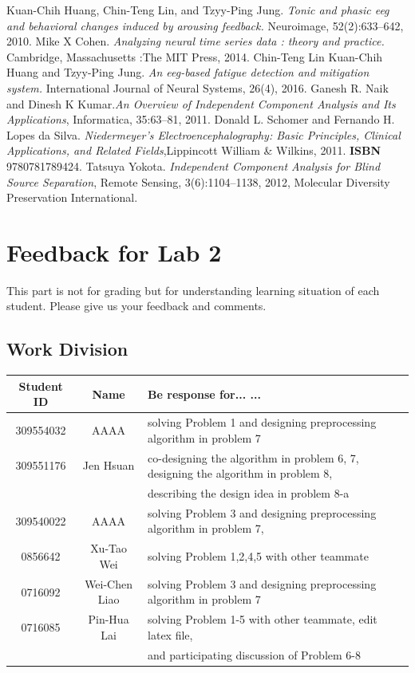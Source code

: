 \documentclass[a4 paper]{article}
\begin{document}
\begin{thebibliography}{6}
Kuan-Chih Huang, Chin-Teng Lin, and Tzyy-Ping Jung. \textit{Tonic and phasic eeg and behavioral changes induced by arousing feedback.} Neuroimage, 52(2):633–642, 2010.
Mike X Cohen. \textit{Analyzing neural time series data : theory and practice.} Cambridge, Massachusetts :The MIT Press, 2014.
\bibitem{}
Chin-Teng Lin Kuan-Chih Huang and Tzyy-Ping Jung. \textit{An eeg-based fatigue detection and mitigation system.} International Journal of Neural Systems, 26(4), 2016.
Ganesh R. Naik and Dinesh K Kumar.\textit{An Overview of Independent Component Analysis and Its Applications}, Informatica, 35:63--81, 2011.
Donald L. Schomer and Fernando H. Lopes da Silva.
\textit{Niedermeyer's Electroencephalography: Basic Principles, Clinical Applications, and Related Fields},Lippincott William \& Wilkins, 2011. \textbf{ISBN} 9780781789424.
Tatsuya Yokota. \textit{Independent Component Analysis for Blind Source Separation}, Remote Sensing, 3(6):1104--1138, 2012, Molecular Diversity Preservation International.
\end{thebibliography}
\newpage
\section{Feedback for Lab 2}
This part is not for grading but for understanding learning situation of each student. Please give us your feedback and comments.
\subsection{Work Division}
\begin{center}
    \begin{tabular}{||c|c|l||}
    \hline
    Student ID & Name & Be response for... ... \\\hline
    309554032 & AAAA & solving Problem 1 and designing preprocessing algorithm in problem 7\\\hline
    309551176 & Jen Hsuan & co-designing the algorithm in problem 6, 7, designing the algorithm in problem 8, \\\hline
     &  & \hspace*{0.5cm}describing the design idea in problem 8-a\\\hline
    309540022 & AAAA & solving Problem 3 and designing preprocessing algorithm in problem 7, \\\hline
    0856642 & Xu-Tao Wei &  solving Problem 1,2,4,5 with other teammate\\\hline
    0716092 & Wei-Chen Liao & solving Problem 3 and designing preprocessing algorithm in problem 7\\\hline
    0716085 & Pin-Hua Lai & solving Problem 1-5 with other teammate, edit latex file, \\\hline
     &  & \hspace*{0.5cm}and participating discussion of Problem 6-8\\\hline
\end{tabular}
\end{center}
\end{document}
